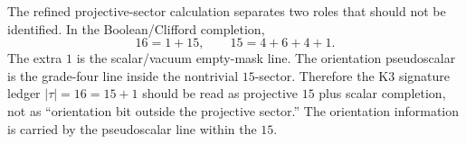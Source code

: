 
\makeatletter
{}
\makeatother
\providecommand{\PSp}{\mathrm{PSp}}
\providecommand{\Aut}{\mathrm{Aut}}
\providecommand{\spec}{\operatorname{spec}}


\begin{remark}
\label{rem:signature-clifford-refinement}
The refined projective-sector calculation separates two roles that should not be
identified.  In the Boolean/Clifford completion,
\[
  16=1+15,\qquad 15=4+6+4+1.
\]
The extra $1$ is the scalar/vacuum empty-mask line.  The orientation pseudoscalar
is the grade-four line inside the nontrivial $15$-sector.  Therefore the K3
signature ledger $|\tau|=16=15+1$ should be read as projective $15$ plus scalar
completion, not as ``orientation bit outside the projective sector.''  The
orientation information is carried by the pseudoscalar line within the $15$.
\end{remark}
